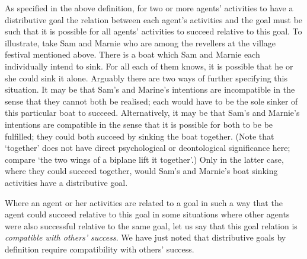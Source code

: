 \documentclass[12pt,a4paper]{extarticle}
\begin{document}
As specified in the above definition, 
	for two or more agents' activities to have a distributive goal 
	the relation between each agent's activities and the goal must be such that it is possible for all agents' activities to succeed relative to this goal.
To illustrate, take Sam and Marnie who are among the revellers at the village festival mentioned above.  There is a boat which Sam and Marnie each individually intend to sink.  
For all each of them knows, it is possible that he or she could sink it alone.
Arguably there are two ways of further specifying this situation.  It may be that Sam's and Marine's intentions are incompatible in the sense that they cannot both be realised; each would have to be the sole sinker of this particular boat to succeed.   Alternatively, it may be that Sam's and Marnie's intentions are compatible in the sense that it is possible for both to be be fulfilled; they could both succeed by sinking the boat together.  
(Note that `together'  does not have direct psychological or deontological significance here; compare `the two wings of a biplane lift it together'.)
Only in the latter case, where they could succeed together, 
 would Sam's and Marnie's boat sinking activities have a distributive goal.


Where an agent or her activities are related to a goal in such a way that the agent could succeed relative to this goal in some situations where other agents were also successful relative to the same goal, let us say that this goal relation is \emph{compatible with others' success}.   
We have just noted that distributive goals by definition require compatibility with others' success.
\end{document}
